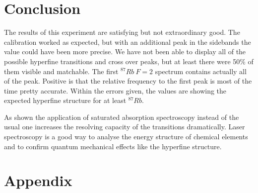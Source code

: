 \documentclass[]{article}
\begin{document}
\newpage
\section{Conclusion}
The results of this experiment are satisfying but not extraordinary good. The calibration worked as expected, but with an additional peak in the sidebands the value could have been more precise. We have not been able to display all of the possible hyperfine transitions and cross over peaks, but at least there were 50\% of them visible and matchable. The first $^{87}Rb\ F=2$ spectrum contains actually all of the peak. Positive is that the relative frequency to the first peak is most of the time pretty accurate. Within the errors given, the values are showing the expected hyperfine structure for at least $^{87}Rb$.

As shown the application of saturated absorption spectroscopy instead of the usual one increases the resolving capacity of the transitions dramatically. Laser spectroscopy is a good way to analyse the energy structure of chemical elements and to confirm quantum mechanical effects like the hyperfine structure.



\section{Appendix}
\end{document}
